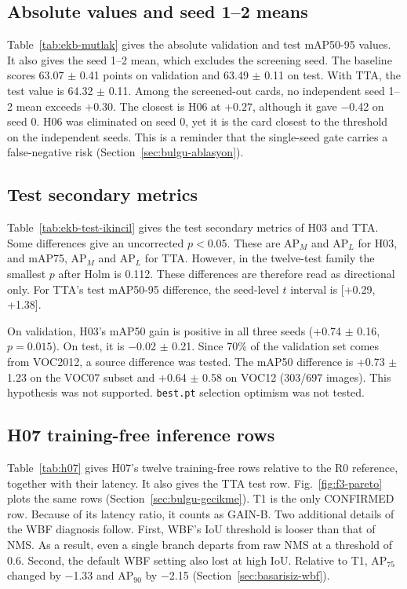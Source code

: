 \subsection{Absolute values and seed 1--2 means}



Table~\ref{tab:ekb-mutlak} gives the absolute validation and test mAP50-95 values. It also gives the seed 1--2 mean, which excludes the screening seed. The baseline scores 63.07 $\pm$ 0.41 points on validation and 63.49 $\pm$ 0.11 on test. With TTA, the test value is 64.32 $\pm$ 0.11. Among the screened-out cards, no independent seed 1--2 mean exceeds $+0.30$. The closest is H06 at $+0.27$, although it gave $-$0.42 on seed 0. H06 was eliminated on seed 0, yet it is the card closest to the threshold on the independent seeds. This is a reminder that the single-seed gate carries a false-negative risk (Section~\ref{sec:bulgu-ablasyon}).

\subsection{Test secondary metrics}



Table~\ref{tab:ekb-test-ikincil} gives the test secondary metrics of H03 and TTA. Some differences give an uncorrected $p<0.05$. These are AP$_M$ and AP$_L$ for H03, and mAP75, AP$_M$ and AP$_L$ for TTA. However, in the twelve-test family the smallest $p$ after Holm is 0.112. These differences are therefore read as directional only. For TTA's test mAP50-95 difference, the seed-level $t$ interval is [+0.29, +1.38].

On validation, H03's mAP50 gain is positive in all three seeds (+0.74 $\pm$ 0.16, $p=0.015$). On test, it is $-$0.02 $\pm$ 0.21. Since 70\% of the validation set comes from VOC2012, a source difference was tested. The mAP50 difference is +0.73 $\pm$ 1.23 on the VOC07 subset and +0.64 $\pm$ 0.58 on VOC12 (303/697 images). This hypothesis was not supported. \texttt{best.pt} selection optimism was not tested.

\subsection{H07 training-free inference rows}



Table~\ref{tab:h07} gives H07's twelve training-free rows relative to the R0 reference, together with their latency. It also gives the TTA test row. Fig.~\ref{fig:f3-pareto} plots the same rows (Section~\ref{sec:bulgu-gecikme}). T1 is the only CONFIRMED row. Because of its latency ratio, it counts as GAIN-B. Two additional details of the WBF diagnosis follow. First, WBF's IoU threshold is looser than that of NMS. As a result, even a single branch departs from raw NMS at a threshold of 0.6. Second, the default WBF setting also lost at high IoU. Relative to T1, AP$_{75}$ changed by $-$1.33 and AP$_{90}$ by $-$2.15 (Section~\ref{sec:basarisiz-wbf}).

